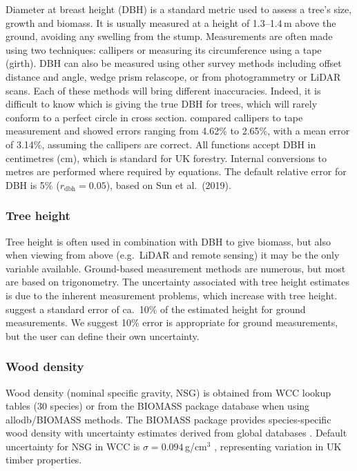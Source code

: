 \documentclass[12pt,a4paper]{article}
\begin{document}
Diameter at breast height (DBH) is a standard metric used to assess a tree's size, growth and biomass. It is usually measured at a height of 1.3--1.4\,m above the ground, avoiding any swelling from the stump. Measurements are often made using two techniques: callipers or measuring its circumference using a tape (girth). DBH can also be measured using other survey methods including offset distance and angle, wedge prism relascope, or from photogrammetry or LiDAR scans. Each of these methods will bring different inaccuracies. Indeed, it is difficult to know which is giving the true DBH for trees, which will rarely conform to a perfect circle in cross section. \citet{Sun2019} compared callipers to tape measurement and showed errors ranging from 4.62\% to 2.65\%, with a mean error of 3.14\%, assuming the callipers are correct. All functions accept DBH in centimetres (cm), which is standard for UK forestry. Internal conversions to metres are performed where required by equations. The default relative error for DBH is 5\% ($r_{\text{dbh}} = 0.05$), based on Sun et al.\ (2019).

\subsubsection{Tree height}

Tree height is often used in combination with DBH to give biomass, but also when viewing from above (e.g.\ LiDAR and remote sensing) it may be the only variable available. Ground-based measurement methods are numerous, but most are based on trigonometry. The uncertainty associated with tree height estimates is due to the inherent measurement problems, which increase with tree height. \citet{Chave2004} suggest a standard error of ca.\ 10\% of the estimated height for ground measurements. We suggest 10\% error is appropriate for ground measurements, but the user can define their own uncertainty.

\subsubsection{Wood density}

Wood density (nominal specific gravity, NSG) is obtained from WCC lookup tables (30 species) or from the BIOMASS package database when using allodb/BIOMASS methods. The BIOMASS package provides species-specific wood density with uncertainty estimates derived from global databases \citep{Zanne2009}. Default uncertainty for NSG in WCC is $\sigma = 0.094$\,g/cm$^3$ \citep{Lavers1983}, representing variation in UK timber properties.
\end{document}
